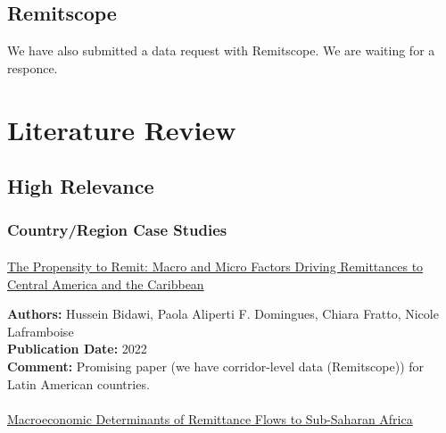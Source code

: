 \documentclass[
  11pt,
]{article}
\makeatletter
\let\oldparagraph\paragraph
\renewcommand{\paragraph}{
    \@ifstar
      \xxxParagraphStar
      \xxxParagraphNoStar
  }
\newcommand{\xxxParagraphStar}[1]{\oldparagraph*{#1}\mbox{}}
\newcommand{\xxxParagraphNoStar}[1]{\oldparagraph{#1}\mbox{}}
\makeatother
\begin{document}
\subsection{Remitscope}\label{remitscope-1}

We have also submitted a data request with Remitscope. We are waiting
for a responce.

\section{Literature Review}\label{literature-review}

\subsection{High Relevance}\label{high-relevance}

\subsubsection{Country/Region Case
Studies}\label{countryregion-case-studies}

\paragraph{\texorpdfstring{\href{https://www.elibrary.imf.org/view/journals/001/2022/203/article-A001-en.xml}{The
Propensity to Remit: Macro and Micro Factors Driving Remittances to
Central America and the
Caribbean}}{The Propensity to Remit: Macro and Micro Factors Driving Remittances to Central America and the Caribbean}}\label{the-propensity-to-remit-macro-and-micro-factors-driving-remittances-to-central-america-and-the-caribbean}

\textbf{Authors:} Hussein Bidawi, Paola Aliperti F. Domingues, Chiara
Fratto, Nicole Laframboise\\
\textbf{Publication Date:} 2022\\
\textbf{Comment:} Promising paper (we have corridor-level data
(Remitscope)) for Latin American countries.

\paragraph{\texorpdfstring{\href{https://www.aercafrica.org/publications/research-papers/macroeconomic-determinants-of-remittance-flows-to-sub-saharan-africa/}{Macroeconomic
Determinants of Remittance Flows to Sub-Saharan
Africa}}{Macroeconomic Determinants of Remittance Flows to Sub-Saharan Africa}}\label{macroeconomic-determinants-of-remittance-flows-to-sub-saharan-africa}
\end{document}
